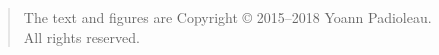 \begin{quote}
The text and figures are Copyright \copyright{} 2015--2018 Yoann Padioleau.\\
All rights reserved.
\end{quote}

